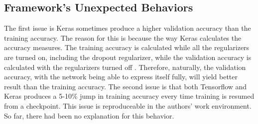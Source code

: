 \documentclass[a4paper]{article}
\begin{document}
\subsection{Framework's Unexpected Behaviors}

The first issue is Keras sometimes produce a higher validation accuracy than the training accuracy. The reason for this is because the way Keras calculates the accuracy measures. The training accuracy is calculated while all the regularizers are turned on, including the dropout regularizer, while the validation accuracy is calculated with the regularizers turned off \cite{5ke2017}. Therefore, naturally, the validation accuracy, with the network being able to express itself fully, will yield better result than the training accuracy. The second issue is that both Tensorflow and Keras produces a 5-10\% jump in training accuracy every time training is resumed from a checkpoint. This issue is reproduceable in the authors' work environment. So far, there had been no explanation for this behavior.



\end{document}
